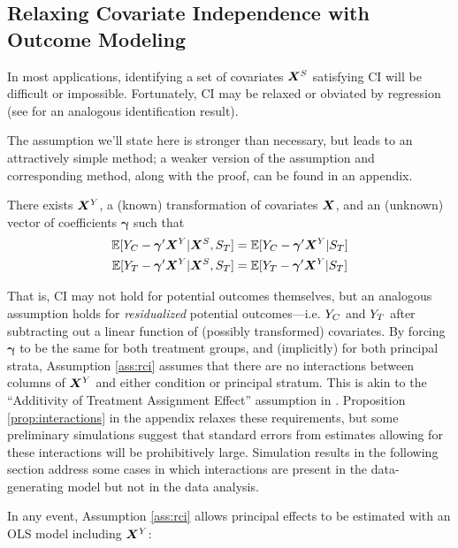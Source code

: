 \documentclass[]{article}
\begin{document}
\subsection{Relaxing Covariate Independence with Outcome Modeling}\label{sec:regression}
In most applications, identifying a set of covariates $\bm{X}^S$ satisfying CI will be difficult or impossible.
Fortunately, CI may be relaxed or obviated by regression (see \citealt[][\S 3.4]{jiangDing2021} for an analogous identification result).

The assumption we'll state here is stronger than necessary, but leads to an attractively simple method; a weaker version of the assumption and corresponding method, along with the proof, can be found in an appendix.

\begin{ass}\label{ass:rci}
There exists $\bm{X}^Y$, a (known) transformation of covariates $\bm{X}$, and an (unknown) vector of coefficients $\bm{\gamma}$ such that
\begin{equation}\label{eq:ass:rci}
\begin{split}
\mathbb{E}[Y_C-\bm{\gamma}'\bm{X}^Y|\bm{X}^S,S_T]&=\mathbb{E}[Y_C-\bm{\gamma}'\bm{X}^Y|S_T]\\
\mathbb{E}[Y_T-\bm{\gamma}'\bm{X}^Y|\bm{X}^S,S_T]&=\mathbb{E}[Y_T-\bm{\gamma}'\bm{X}^Y|S_T]
\end{split}
\end{equation}
\end{ass}
That is, CI may not hold for potential outcomes themselves, but an analogous assumption holds for \emph{residualized} potential outcomes---i.e. $Y_C$ and $Y_T$ after subtracting out a linear function of (possibly transformed) covariates.
By forcing $\bm{\gamma}$ to be the same for both treatment groups, and (implicitly) for both principal strata, Assumption \ref{ass:rci} assumes that there are no interactions between columns of $\bm{X}^Y$ and either condition or principal stratum.
This is akin to the ``Additivity of Treatment Assignment Effect'' assumption in \citet{jo2002}.
Proposition \ref{prop:interactions} in the appendix relaxes these requirements, but some preliminary simulations suggest that standard errors from estimates allowing for these interactions will be prohibitively large.
Simulation results in the following section address some cases in which interactions are present in the data-generating model but not in the data analysis.

In any event, Assumption \ref{ass:rci} allows principal effects to be estimated with an OLS model including $\bm{X}^Y$:
\end{document}

